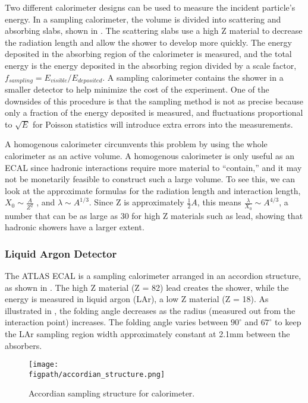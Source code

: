 Two different calorimeter designs can be used to measure the incident particle's energy.  In a sampling calorimeter, the volume is divided into scattering and absorbing slabs, shown in .  
The scattering slabs use a high Z material to decrease the radiation length and allow the shower to develop more quickly.  
The energy deposited in the absorbing region of the calorimeter is measured, and the total energy is the energy deposited in the absorbing region divided by a scale factor, $f_{sampling}= E_{visible} / E_{deposited}$.   A sampling calorimeter contains the shower in a smaller detector to help minimize the cost of the experiment.  
One of the downsides of this procedure is that the sampling method is not as precise because only a fraction of the energy deposited is measured, and fluctuations proportional to $\sqrt{E}$ for Poisson statistics will introduce extra errors into the measurements.

A homogenous calorimeter circumvents this problem by using the whole calorimeter as an active volume.  
A homogenous calorimeter is only useful as an ECAL since hadronic interactions require more material to ``contain,'' and it may not be monetarily feasible to construct such a large volume.  
To see this, we can look at the approximate formulas for the radiation length and interaction length, $X_0\sim \frac{A}{Z^2}$ , and $\lambda \sim A^{1/3}$. Since Z is approximately $\frac{1}{2} A$, this means  $\frac{\lambda}{X_0} \sim A^{4/3}$, a number that can be as large as 30 for high Z materials such as lead, showing that hadronic showers have a larger extent.  

\subsubsection{Liquid Argon Detector}
The ATLAS ECAL is a sampling calorimeter arranged in an accordion structure, as shown in .  The high Z material (Z = 82) lead creates the shower, while the energy is measured in liquid argon (LAr), a low Z material (Z = 18).  
As illustrated in , the folding angle decreases as the  radius (measured out from the interaction point) increases.  The folding angle varies between $90^\circ$ and $67^\circ$ to keep the LAr sampling region width approximately constant at 2.1mm between the absorbers.

\begin{figure}[h!tbp]
\centering
\texttt{[image: \\figpath/accordian\_structure.png]}
\caption{Accordian sampling structure for calorimeter.
~\cite{LAr}}
\label{accordian-structure}
\end{figure}

